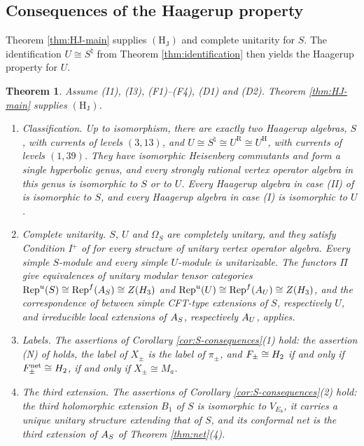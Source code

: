 \documentclass[leqno]{article}
\let\cal\relax
\newcommand{\cal}{\mathcal}
\DeclareMathOperator{\Rep}{Rep}
\newtheorem{thm}{Theorem}[section]
\numberwithin{equation}{section}
\begin{document}
\subsection{Consequences of the Haagerup property}
\label{subsec:consequences}

Theorem \ref{thm:HJ-main} supplies $\mathrm{(H_J)}$ and complete unitarity for $S$. The identification $U\cong S^\natural$ from Theorem \ref{thm:identification} then yields the Haagerup property for $U$.

\begin{thm}
\label{thm:consequences}
Assume \textup{(I1)}, \textup{(I3)}, \textup{(F1)}--\textup{(F4)}, \textup{(D1)} and \textup{(D2)}. Theorem \ref{thm:HJ-main} supplies $\mathrm{(H_J)}$.
\begin{enumerate}
\item \emph{Classification.} Up to isomorphism, there are exactly two Haagerup algebras, $S$, with currents of levels $(3,13)$, and $U \cong S^\natural \cong U^{\mathrm R} \cong U^{\mathrm H}$, with currents of levels $(1,39)$. They have isomorphic Heisenberg commutants and form a single hyperbolic genus, and every strongly rational vertex operator algebra in this genus is isomorphic to $S$ or to $U$. Every Haagerup algebra in case \textup{(II)} of \cite[Theorem 8.5]{Arh26} is isomorphic to $S$, and every Haagerup algebra in case \textup{(I)} is isomorphic to $U$.
\item \emph{Complete unitarity.} $S$, $U$ and $\Omega_S$ are completely unitary, and they satisfy Condition I$^+$ of \cite[Definition 6.17]{Gui25} for every structure of unitary vertex operator algebra. Every simple $S$-module and every simple $U$-module is unitarizable. The functors $\Pi$ give equivalences of unitary modular tensor categories $\Rep^u(S) \cong \Rep^f(\cal A_S) \cong Z(\cal H_3)$ and $\Rep^u(U) \cong \Rep^f(\cal A_U) \cong Z(\cal H_3)$, and the correspondence of \cite[Theorem 4.10 p.~21]{CGGH23} between simple CFT-type extensions of $S$, respectively $U$, and irreducible local extensions of $\cal A_S$, respectively $\cal A_U$, applies.
\item \emph{Labels.} The assertions of Corollary \ref{cor:S-consequences}(1) hold: the assertion \textup{(N)} of \cite[Section 7]{ArhII} holds, the label of $X_\pm$ is the label of $\pi_\pm$, and $\cal F_\pm \cong \cal H_2$ if and only if $\cal F^{\mathrm{net}}_\pm \cong \cal H_2$, if and only if $X_\pm \cong M_a$.
\item \emph{The third extension.} The assertions of Corollary \ref{cor:S-consequences}(2) hold: the third holomorphic extension $B_1$ of $S$ is isomorphic to $V_{E_8}$, it carries a unique unitary structure extending that of $S$, and its conformal net is the third extension of $\cal A_S$ of Theorem \ref{thm:net}(4).
\end{enumerate}
\end{thm}
\end{document}
